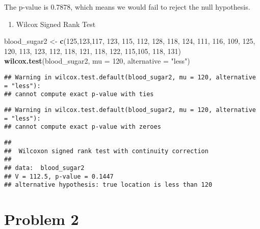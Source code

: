 \documentclass[
]{article}
\newenvironment{Shaded}{\begin{snugshade}}{\end{snugshade}}
\newcommand{\AttributeTok}[1]{\textcolor[rgb]{0.13,0.29,0.53}{#1}}
\newcommand{\DecValTok}[1]{\textcolor[rgb]{0.00,0.00,0.81}{#1}}
\newcommand{\FunctionTok}[1]{\textcolor[rgb]{0.13,0.29,0.53}{\textbf{#1}}}
\newcommand{\NormalTok}[1]{#1}
\newcommand{\OtherTok}[1]{\textcolor[rgb]{0.56,0.35,0.01}{#1}}
\newcommand{\StringTok}[1]{\textcolor[rgb]{0.31,0.60,0.02}{#1}}
\providecommand{\tightlist}{%
  \setlength{\itemsep}{0pt}\setlength{\parskip}{0pt}}
\begin{document}
The p-value is 0.7878, which means we would fail to reject the null
hypothesis.

\begin{enumerate}
\def\labelenumi{\alph{enumi})}
\setcounter{enumi}{1}
\tightlist
\item
  Wilcox Signed Rank Test
\end{enumerate}

\begin{Shaded}
\begin{Highlighting}[]
\NormalTok{blood\_sugar2 }\OtherTok{\textless{}{-}} \FunctionTok{c}\NormalTok{(}\DecValTok{125}\NormalTok{,}\DecValTok{123}\NormalTok{,}\DecValTok{117}\NormalTok{, }\DecValTok{123}\NormalTok{, }\DecValTok{115}\NormalTok{, }\DecValTok{112}\NormalTok{, }\DecValTok{128}\NormalTok{, }\DecValTok{118}\NormalTok{, }\DecValTok{124}\NormalTok{, }\DecValTok{111}\NormalTok{, }\DecValTok{116}\NormalTok{, }
                       \DecValTok{109}\NormalTok{, }\DecValTok{125}\NormalTok{, }\DecValTok{120}\NormalTok{, }\DecValTok{113}\NormalTok{, }\DecValTok{123}\NormalTok{, }\DecValTok{112}\NormalTok{, }\DecValTok{118}\NormalTok{, }\DecValTok{121}\NormalTok{, }\DecValTok{118}\NormalTok{, }\DecValTok{122}\NormalTok{, }\DecValTok{115}\NormalTok{,}\DecValTok{105}\NormalTok{, }
                       \DecValTok{118}\NormalTok{, }\DecValTok{131}\NormalTok{)}
\FunctionTok{wilcox.test}\NormalTok{(blood\_sugar2, }\AttributeTok{mu =} \DecValTok{120}\NormalTok{, }\AttributeTok{alternative =} \StringTok{"less"}\NormalTok{)}
\end{Highlighting}
\end{Shaded}

\begin{verbatim}
## Warning in wilcox.test.default(blood_sugar2, mu = 120, alternative = "less"):
## cannot compute exact p-value with ties
\end{verbatim}

\begin{verbatim}
## Warning in wilcox.test.default(blood_sugar2, mu = 120, alternative = "less"):
## cannot compute exact p-value with zeroes
\end{verbatim}

\begin{verbatim}
## 
##  Wilcoxon signed rank test with continuity correction
## 
## data:  blood_sugar2
## V = 112.5, p-value = 0.1447
## alternative hypothesis: true location is less than 120
\end{verbatim}

\section{Problem 2}\label{problem-2}
\end{document}
